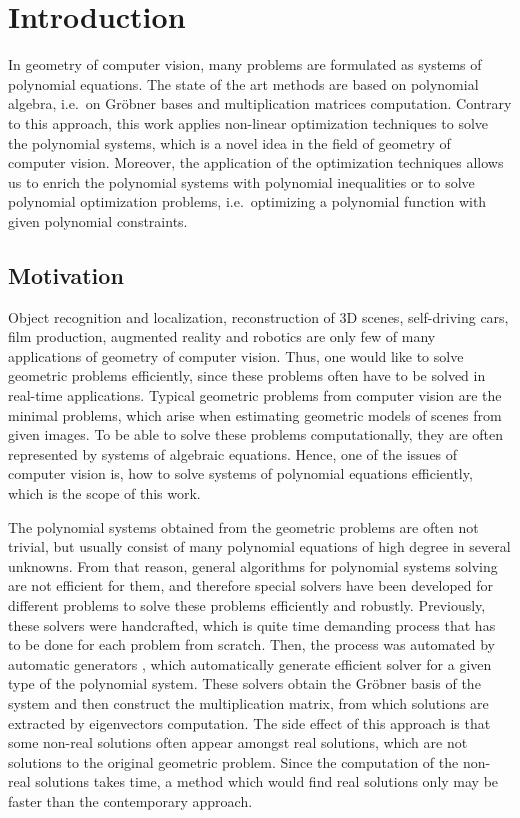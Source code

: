 \chapter{Introduction}
In geometry of computer vision, many problems are formulated as systems of polynomial equations.
The state of the art methods are based on polynomial algebra, i.e.\ on Gr\"obner bases and multiplication matrices computation.
Contrary to this approach, this work applies non-linear optimization techniques to solve the polynomial systems, which is a novel idea in the field of geometry of computer vision.
Moreover, the application of the optimization techniques allows us to enrich the polynomial systems with polynomial inequalities or to solve polynomial optimization problems, i.e.\ optimizing a polynomial function with given polynomial constraints.

\section{Motivation}
Object recognition and localization, reconstruction of 3D scenes, self-driving cars, film production, augmented reality and robotics are only few of many applications of geometry of computer vision.
Thus, one would like to solve geometric problems efficiently, since these problems often have to be solved in real-time applications.
Typical geometric problems from computer vision are the minimal problems, which arise when estimating geometric models of scenes from given images.
To be able to solve these problems computationally, they are often represented by systems of algebraic equations.
Hence, one of the issues of computer vision is, how to solve systems of polynomial equations efficiently, which is the scope of this work.

The polynomial systems obtained from the geometric problems are often not trivial, but usually consist of many polynomial equations of high degree in several unknowns.
From that reason, general algorithms for polynomial systems solving are not efficient for them, and therefore special solvers have been developed for different problems to solve these problems efficiently and robustly.
Previously, these solvers were handcrafted, which is quite time demanding process that has to be done for each problem from scratch.
Then, the process was automated by automatic generators \cite{autogen, larsson}, which automatically generate efficient solver for a given type of the polynomial system.
These solvers obtain the Gr\"obner basis of the system and then construct the multiplication matrix, from which solutions are extracted by eigenvectors computation.
The side effect of this approach is that some non-real solutions often appear amongst real solutions, which are not solutions to the original geometric problem.
Since the computation of the non-real solutions takes time, a method which would find real solutions only may be faster than the contemporary approach.

